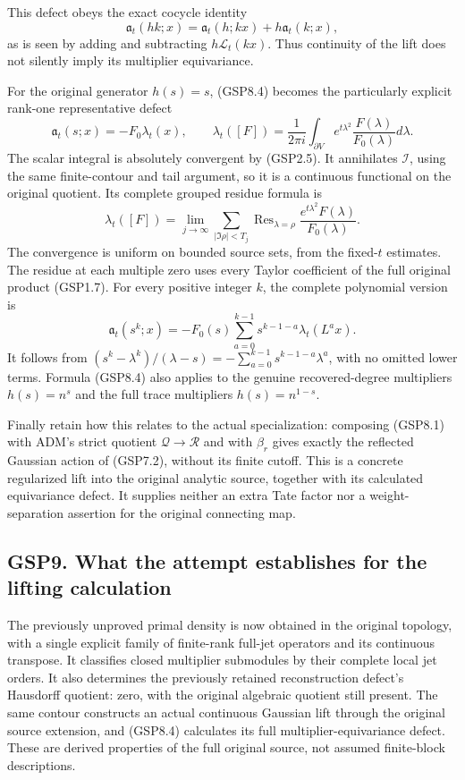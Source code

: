This defect obeys the exact cocycle identity \[
\mathfrak a_t(hk;x)=\mathfrak a_t(h;kx)+h\mathfrak a_t(k;x),
\tag{GSP8.5}
\] as is seen by adding and subtracting \(h\mathcal L_t(kx)\). Thus
continuity of the lift does not silently imply its multiplier
equivariance.

For the original generator \(h(s)=s\), (GSP8.4) becomes the particularly
explicit rank-one representative defect \[
\mathfrak a_t(s;x)=-F_0\lambda_t(x),\qquad
\lambda_t([F])=\frac1{2\pi i}\int_{\partial V}
e^{t\lambda^2}\frac{F(\lambda)}{F_0(\lambda)}d\lambda.
\tag{GSP8.6}
\] The scalar integral is absolutely convergent by (GSP2.5). It
annihilates \(\mathcal I\), using the same finite-contour and tail
argument, so it is a continuous functional on the original quotient. Its
complete grouped residue formula is \[
\lambda_t([F])=\lim_{j\to\infty}
\sum_{|\Im\rho|<T_j}
\operatorname{Res}_{\lambda=\rho}
\frac{e^{t\lambda^2}F(\lambda)}{F_0(\lambda)}.
\tag{GSP8.7}
\] The convergence is uniform on bounded source sets, from the
fixed-\(t\) estimates. The residue at each multiple zero uses every
Taylor coefficient of the full original product (GSP1.7). For every
positive integer \(k\), the complete polynomial version is \[
\mathfrak a_t(s^k;x)
=-F_0(s)\sum_{a=0}^{k-1}s^{k-1-a}\lambda_t(L^a x).
\tag{GSP8.8}
\] It follows from
\((s^k-\lambda^k)/(\lambda-s)=-\sum_{a=0}^{k-1}s^{k-1-a}\lambda^a\),
with no omitted lower terms. Formula (GSP8.4) also applies to the
genuine recovered-degree multipliers \(h(s)=n^s\) and the full trace
multipliers \(h(s)=n^{1-s}\).

Finally retain how this relates to the actual specialization: composing
(GSP8.1) with ADM's strict quotient \(\mathcal Q\to\mathcal R\) and with
\(\beta_r\) gives exactly the reflected Gaussian action of (GSP7.2),
without its finite cutoff. This is a concrete regularized lift into the
original analytic source, together with its calculated equivariance
defect. It supplies neither an extra Tate factor nor a weight-separation
assertion for the original connecting map.

\subsection{GSP9. What the attempt establishes for the lifting
calculation}\label{gsp9.-what-the-attempt-establishes-for-the-lifting-calculation}

The previously unproved primal density is now obtained in the original
topology, with a single explicit family of finite-rank full-jet
operators and its continuous transpose. It classifies closed multiplier
submodules by their complete local jet orders. It also determines the
previously retained reconstruction defect's Hausdorff quotient: zero,
with the original algebraic quotient still present. The same contour
constructs an actual continuous Gaussian lift through the original
source extension, and (GSP8.4) calculates its full
multiplier-equivariance defect. These are derived properties of the full
original source, not assumed finite-block descriptions.

